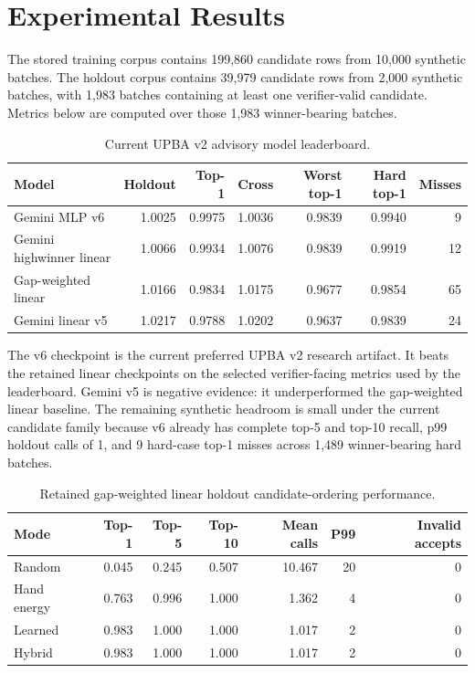 \documentclass[11pt]{article}
\begin{document}
\section{Experimental Results}

The stored training corpus contains 199,860 candidate rows from 10,000 synthetic
batches. The holdout corpus contains 39,979 candidate rows from 2,000 synthetic
batches, with 1,983 batches containing at least one verifier-valid candidate.
Metrics below are computed over those 1,983 winner-bearing batches.

\begin{table}[h]
\centering
\caption{Current UPBA v2 advisory model leaderboard.}
\small
\begin{tabular}{lrrrrrr}
\toprule
Model & Holdout & Top-1 & Cross & Worst top-1 & Hard top-1 & Misses \\
\midrule
Gemini MLP v6 & 1.0025 & 0.9975 & 1.0036 & 0.9839 & 0.9940 & 9 \\
Gemini highwinner linear & 1.0066 & 0.9934 & 1.0076 & 0.9839 & 0.9919 & 12 \\
Gap-weighted linear & 1.0166 & 0.9834 & 1.0175 & 0.9677 & 0.9854 & 65 \\
Gemini linear v5 & 1.0217 & 0.9788 & 1.0202 & 0.9637 & 0.9839 & 24 \\
\bottomrule
\end{tabular}
\end{table}

The v6 checkpoint is the current preferred UPBA v2 research artifact. It beats
the retained linear checkpoints on the selected verifier-facing metrics used by
the leaderboard. Gemini v5 is negative evidence: it underperformed the
gap-weighted linear baseline. The remaining synthetic headroom is small under
the current candidate family because v6 already has complete top-5 and top-10
recall, p99 holdout calls of 1, and 9 hard-case top-1 misses across 1,489
winner-bearing hard batches.

\begin{table}[h]
\centering
\caption{Retained gap-weighted linear holdout candidate-ordering performance.}
\begin{tabular}{lrrrrrr}
\toprule
Mode & Top-1 & Top-5 & Top-10 & Mean calls & P99 & Invalid accepts \\
\midrule
Random & 0.045 & 0.245 & 0.507 & 10.467 & 20 & 0 \\
Hand energy & 0.763 & 0.996 & 1.000 & 1.362 & 4 & 0 \\
Learned & 0.983 & 1.000 & 1.000 & 1.017 & 2 & 0 \\
Hybrid & 0.983 & 1.000 & 1.000 & 1.017 & 2 & 0 \\
\bottomrule
\end{tabular}
\end{table}
\end{document}
